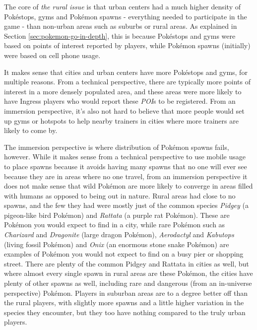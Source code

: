 The core of \emph{the rural issue} is that urban centers had a much higher density of Pokéstops, gyms and Pokémon spawns - everything needed to participate in the game - than non-urban areas such as suburbs or rural areas. As explained in Section \ref{sec:pokemon-go-in-depth}, this is because Pokéstops and gyms were based on points of interest reported by players, while Pokémon spawns (initially) were based on cell phone usage.

It makes sense that cities and urban centers have more Pokéstops and gyms, for multiple reasons. From a technical perspective, there are typically more points of interest in a more densely populated area, and these areas were more likely to have Ingress players who would report these \emph{POI}s to be registered. From an immersion perspective, it's also not hard to believe that more people would set up gyms or hotspots to help nearby trainers in cities where more trainers are likely to come by.

The immersion perspective is where distribution of Pokémon spawns fails, however. While it makes sense from a technical perspective to use mobile usage to place spawns because it avoids having many spawns that no one will ever see because they are in areas where no one travel, from an immersion perspective it does not make sense that wild Pokémon are more likely to converge in areas filled with humans as opposed to being out in nature. Rural areas had close to no spawns, and the few they had were mostly just of the common species \emph{Pidgey} (a pigeon-like bird Pokémon) and \emph{Rattata} (a purple rat Pokémon). These are Pokémon you would expect to find in a city, while rare Pokémon such as \emph{Charizard} and \emph{Dragonite} (large dragon Pokémon), \emph{Aerodactyl} and \emph{Kabutops} (living fossil Pokémon) and \emph{Onix} (an enormous stone snake Pokémon) are examples of Pokémon you would not expect to find on a busy pier or shopping street. There are plenty of the common Pidgey and Rattata in cities as well, but where almost every single spawn in rural areas are these Pokémon, the cities have plenty of other spawns as well, including rare and dangerous (from an in-universe perspective) Pokémon. Players in suburban areas are to a degree better off than the rural players, with slightly more spawns and a little higher variation in the species they encounter, but they too have nothing  compared to the truly urban players.


